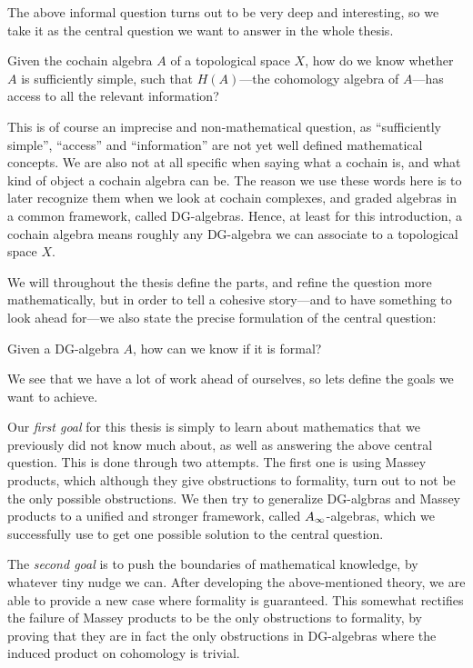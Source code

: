 The above informal question turns out to be very deep and interesting, so we take it as the central question we want to answer in the whole thesis. 

\begin{central}
Given the cochain algebra $A$ of a topological space $X$, how do we know whether $A$ is sufficiently simple, such that $H(A)$---the cohomology algebra of $A$---has access to all the relevant information?
\end{central}

This is of course an imprecise and non-mathematical question, as ``sufficiently simple'', ``access'' and ``information'' are not yet well defined mathematical concepts. We are also not at all specific when saying what a cochain is, and what kind of object a cochain algebra can be. The reason we use these words here is to later recognize them when we look at cochain complexes, and graded algebras in a common framework, called DG-algebras. Hence, at least for this introduction, a cochain algebra means roughly any DG-algebra we can associate to a topological space $X$. 

We will throughout the thesis define the parts, and refine the question more mathematically, but in order to tell a cohesive story---and to have something to look ahead for---we also state the precise formulation of the central question:

\begin{central}
Given a DG-algebra $A$, how can we know if it is formal?
\end{central}

We see that we have a lot of work ahead of ourselves, so lets define the goals we want to achieve. 

Our \textit{first goal} for this thesis is simply to learn about mathematics that we previously did not know much about, as well as answering the above central question. This is done through two attempts. The first one is using Massey products, which although they give obstructions to formality, turn out to not be the only possible obstructions. We then try to generalize DG-algbras and Massey products to a unified and stronger framework, called $A_{\infty}$-algebras, which we successfully use to get one possible solution to the central question. 

The \textit{second goal} is to push the boundaries of mathematical knowledge, by whatever tiny nudge we can. After developing the above-mentioned theory, we are able to provide a new case where formality is guaranteed. This somewhat rectifies the failure of Massey products to be the only obstructions to formality, by proving that they are in fact the only obstructions in DG-algebras where the induced product on cohomology is trivial. 

